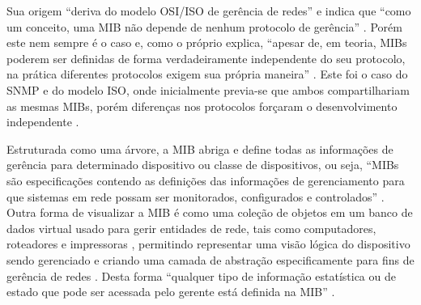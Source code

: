 \documentclass[twoside,english,brazilian]{UNISINOSmonografia}
\begin{document}
Sua origem ``deriva do modelo OSI/ISO de gerência de redes''
\cite[p.~46]{Ding2009} 
e indica que
``como um conceito, uma MIB não depende de nenhum protocolo de gerência''
\cite[p.~222]{Clemm2006}.
Porém este nem sempre é o caso e, como o próprio  
explica, 
``apesar de, em teoria, MIBs poderem ser definidas de forma verdadeiramente 
independente do seu protocolo, na prática diferentes protocolos exigem sua 
própria maneira''
.
Este foi o caso do SNMP e do modelo ISO, onde inicialmente previa-se que ambos 
compartilhariam as mesmas MIBs, porém diferenças nos protocolos forçaram o 
desenvolvimento independente \cite{Hunt1997,stallings1999snmp,Leinwand1996}.

Estruturada como uma árvore, a MIB abriga e define todas as informações de 
gerência para determinado dispositivo ou classe de dispositivos, ou seja, 
``MIBs são especificações contendo as definições das informações de 
gerenciamento para que sistemas em rede possam ser monitorados, configurados e 
controlados''
\cite[p.~1]{perkins1997understanding}.
Outra forma de visualizar a MIB é como uma coleção de objetos em um banco de 
dados virtual usado para gerir entidades de rede, tais como computadores, 
roteadores e impressoras 
\cite{Ding2009}, permitindo representar uma visão lógica do dispositivo sendo 
gerenciado e criando uma camada de abstração especificamente para fins de 
gerência de redes 
\cite{Clemm2006}.
Desta forma 
``qualquer tipo de informação estatística ou de estado que pode ser acessada 
pelo gerente está definida na MIB''
\cite[p.~4]{Mauro2009}.
\end{document}
